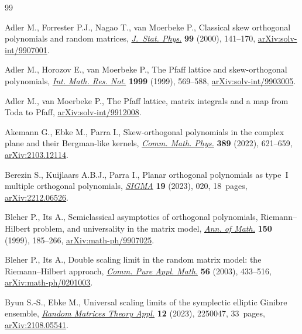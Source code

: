 \documentclass[pdftex]{sigma}
\numberwithin{equation}{section}
\begin{document}
\begin{thebibliography}{99}
\footnotesize\itemsep=0pt

Adler M., Forrester P.J., Nagao T., van Moerbeke P., Classical skew orthogonal
 polynomials and random matrices, \href{https://doi.org/10.1023/A:1018644606835}{\textit{J.~Stat. Phys.}} \textbf{99} (2000),
 141--170, \href{https://arxiv.org/abs/solv-int/9907001}{arXiv:solv-int/9907001}.

Adler M., Horozov E., van Moerbeke P., The {P}faff lattice and skew-orthogonal
 polynomials, \href{https://doi.org/10.1155/S107379289900029X}{\textit{Int. Math. Res. Not.}} \textbf{1999} (1999), 569--588,
 \href{https://arxiv.org/abs/solv-int/9903005}{arXiv:solv-int/9903005}.

Adler M., van Moerbeke P., The {P}faff lattice, matrix integrals and a map from
 {T}oda to {P}faff, \href{https://arxiv.org/abs/solv-int/9912008}{arXiv:solv-int/9912008}.

Akemann G., Ebke M., Parra I., Skew-orthogonal polynomials in the complex plane
 and their {B}ergman-like kernels, \href{https://doi.org/10.1007/s00220-021-04230-8}{\textit{Comm. Math. Phys.}} \textbf{389}
 (2022), 621--659, \href{https://arxiv.org/abs/2103.12114}{arXiv:2103.12114}.

Berezin S., Kuijlaars A.B.J., Parra I., Planar orthogonal polynomials as
 type~{I} multiple orthogonal polynomials, \href{https://doi.org/10.3842/SIGMA.2023.020}{\textit{SIGMA}} \textbf{19} (2023),
 020, 18~pages, \href{https://arxiv.org/abs/2212.06526}{arXiv:2212.06526}.

Bleher P., Its A., Semiclassical asymptotics of orthogonal polynomials,
 {R}iemann--{H}ilbert problem, and universality in the matrix model,
 \href{https://doi.org/10.2307/121101}{\textit{Ann. of Math.}} \textbf{150} (1999), 185--266,
 \href{https://arxiv.org/abs/math-ph/9907025}{arXiv:math-ph/9907025}.

Bleher P., Its A., Double scaling limit in the random matrix model: the
 {R}iemann--{H}ilbert approach, \href{https://doi.org/10.1002/cpa.10065}{\textit{Comm. Pure Appl. Math.}} \textbf{56}
 (2003), 433--516, \href{https://arxiv.org/abs/math-ph/0201003}{arXiv:math-ph/0201003}.

Byun S.-S., Ebke M., Universal scaling limits of the symplectic elliptic
 {G}inibre ensemble, \href{https://doi.org/10.1142/S2010326322500472}{\textit{Random Matrices Theory Appl.}} \textbf{12} (2023),
 2250047, 33~pages, \href{https://arxiv.org/abs/2108.05541}{arXiv:2108.05541}.


\end{thebibliography}
\end{document}
